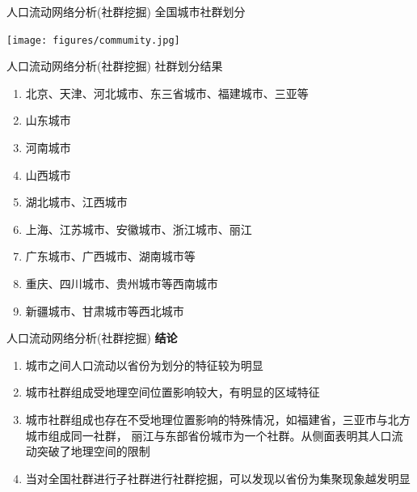 \begin{frame}[t]{人口流动网络分析(社群挖掘)}
    全国城市社群划分

    \texttt{[image: figures/commumity.jpg]}
\end{frame}

\begin{frame}[t]{人口流动网络分析(社群挖掘)}
    \alert{社群划分结果}

    \begin{enumerate}
        \item 北京、天津、河北城市、东三省城市、福建城市、三亚等
        \item 山东城市
        \item 河南城市
        \item 山西城市
        \item 湖北城市、江西城市
        \item 上海、江苏城市、安徽城市、浙江城市、丽江
        \item 广东城市、广西城市、湖南城市等
        \item 重庆、四川城市、贵州城市等西南城市
        \item 新疆城市、甘肃城市等西北城市
    \end{enumerate}
\end{frame}

\begin{frame}[t]{人口流动网络分析(社群挖掘)}
    \textbf{结论}

    \begin{enumerate}
        \item 城市之间人口流动以省份为划分的特征较为明显
        \item 城市社群组成受地理空间位置影响较大，有明显的区域特征
        \item 城市社群组成也存在不受地理位置影响的特殊情况，如福建省，三亚市与北方城市组成同一社群，
              丽江与东部省份城市为一个社群。从侧面表明其人口流动突破了地理空间的限制
        \item 当对全国社群进行子社群进行社群挖掘，可以发现以省份为集聚现象越发明显
    \end{enumerate}
\end{frame}
